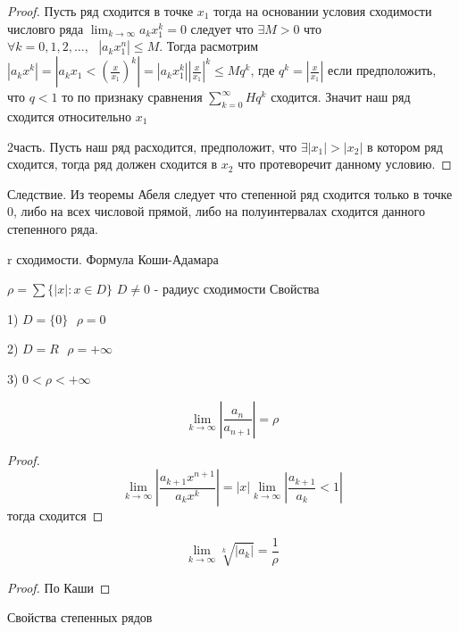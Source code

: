 \begin{proof}
  Пусть ряд сходится в точке $x_1$ тогда на основании условия сходимости
  числовго ряда $\lim_{k \to \infty} a_k x_1^k = 0$ следует что $\exists M > 0$
  что $\forall k = 0, 1,2, \ldots,  ~~~ |a_k x_1^n| \le M$. Тогда
  расмотрим $|a_k x^k| = \left| a_k x_1 < \left( \frac{x}{x_1} \right)^k
  \right| = |a_k x_1^k| \left| \frac{x}{x_1} \right|^k \le Mq^k$, где
  $q^k = \left| \frac{x}{x_1} \right|$ если предположить, что $q < 1$ то по
  признаку сравнения $\sum_{k=0}^{\infty} Hq^k$ сходится. Значит наш ряд
  сходится относительно $x_1$

  2часть. Пусть наш ряд расходится, предположит, что $\exists |x_1| > |x_2|$ в
  котором ряд сходится, тогда ряд должен сходится в $x_2$ что протеворечит
  данному условию.
\end{proof}

Следствие. Из теоремы Абеля следует что степенной ряд сходится только в точке
0, либо на всех числовой прямой, либо на полуинтервалах сходится данного
степенного ряда.

\begin{title}
  r сходимости. Формула Коши-Адамара
\end{title}

$\rho = \sum\{ |x| : x \in D \}$ $D \not= 0$ - радиус сходимости
Свойства

1) $D = \{0\} ~~~ \rho = 0$

2) $D = R ~~~ \rho = +\infty$

3) $0 < \rho < +\infty$

\begin{theorem}
  $$
  \lim_{k \to \infty} \left| \frac{a_n}{a_{n+1}} \right| = \rho
  $$
\end{theorem}

\begin{proof}
  $$
  \lim_{k \to \infty} \left| \frac{a_{k+1} x^{n+1}}{a_k x^k} \right| =
  |x| \lim_{k \to \infty} \left| \frac{a_{k+1}}{a_k} < 1 \right|
  $$
  тогда сходится
\end{proof}

\begin{theorem}
  $$
  \lim_{k \to \infty} \sqrt[k]{|a_k|} = \frac{1}{\rho}
  $$
\end{theorem}

\begin{proof}
  По Каши
\end{proof}

\begin{title}
  Свойства степенных рядов
\end{title}

